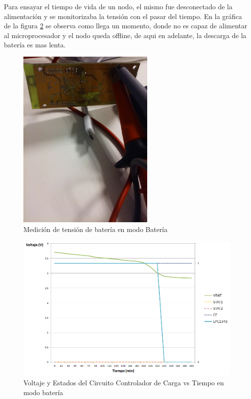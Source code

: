 

Para ensayar el tiempo de vida de un nodo, el mismo fue desconectado de la alimentación y se monitorizaba la tensión con el pasar del tiempo. En la gráfica de la figura \ref{fig:modobat} se observa como llega un momento, donde no es capaz de alimentar al microprocesador y el nodo queda offline, de aqui en adelante, la descarga de la batería es mas lenta.

\vspace{10px}
\begin{figure}[h!]
	\centering
    \includegraphics[width=0.6\textwidth]{./Figures/des.jpg}
    	\caption{Medición de tensión de batería en modo Batería}
	\label{fig:curva}
\end{figure}

\vspace{10px}
\begin{figure}[h!]
	\centering
    \includegraphics[width=1.2\textwidth]{./Figures/descarga.png}
    	\caption{Voltaje y Estados del Circuito Controlador de Carga vs Tiempo en modo batería}
	\label{fig:modobat}
\end{figure}

